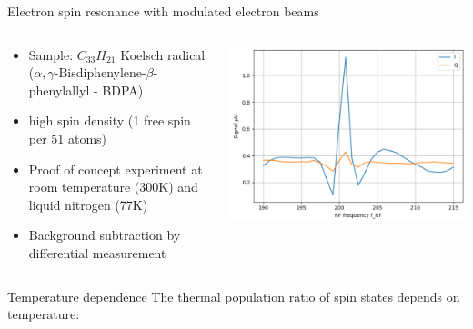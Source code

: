 \documentclass[final]{beamer}
\begin{document}
\begin{frame}[fragile]{}
\begin{columns}[T]
\begin{column}{.49\linewidth}
\begin{block}{\Large Electron spin resonance with modulated electron beams}
        \begin{columns}
          \begin{column}{0.6\columnwidth}
            \begin{itemize}
              \item Sample: $C_{33}H_{21}$
                Koelsch radical ($\alpha,\gamma$-Bisdiphenylene-$\beta$-phenylallyl - BDPA)
              \item high spin density (1 free spin per 51 atoms)
              \item Proof of concept experiment at room temperature (300K) and liquid nitrogen (77K)
              \item Background subtraction by differential measurement
            \end{itemize}
          \end{column}
          \begin{column}{0.4\columnwidth}
            \includegraphics[width=\columnwidth]{figures/eprsignal.png}
          \end{column}
        \end{columns}
      \end{block}

      \begin{block}{\Large Temperature dependence}
        The thermal population ratio of spin states depends on temperature:
        

\end{block}
\end{column}
\end{columns}
\end{frame}
\end{document}
